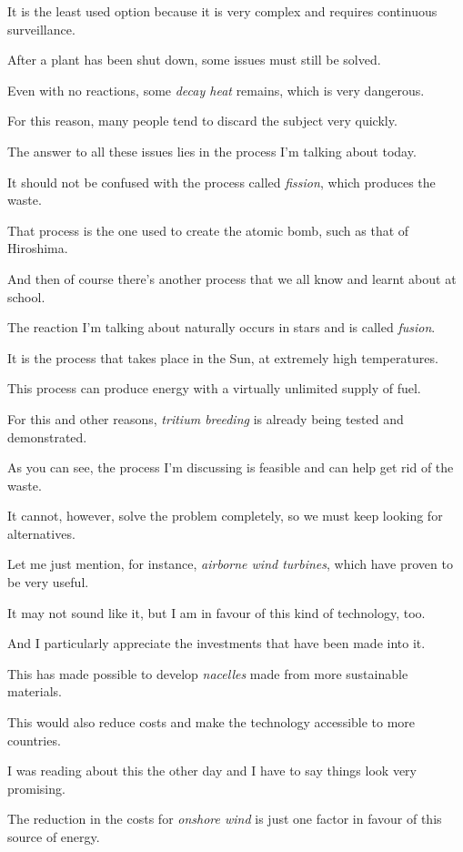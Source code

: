 It is the least used option because it is very complex and requires continuous surveillance.

\ex After a plant has been shut down, some issues must still be solved.

Even with no reactions, some \textit{decay heat} remains, which is very dangerous.

For this reason, many people tend to discard the subject very quickly.

\ex The answer to all these issues lies in the process I'm talking about today.

It should not be confused with the process called \textit{fission}, which produces the waste.

That process is the one used to create the atomic bomb, such as that of Hiroshima.

\ex And then of course there's another process that we all know and learnt about at school.

The reaction I'm talking about naturally occurs in stars and is called \textit{fusion}.

It is the process that takes place in the Sun, at extremely high temperatures.

\ex This process can produce energy with a virtually unlimited supply of fuel.

For this and other reasons, \textit{tritium breeding} is already being tested and demonstrated.

As you can see, the process I'm discussing is feasible and can help get rid of the waste.

\ex It cannot, however, solve the problem completely, so we must keep looking for alternatives.

Let me just mention, for instance, \textit{airborne wind turbines}, which have proven to be very useful.

It may not sound like it, but I am in favour of this kind of technology, too.

\ex And I particularly appreciate the investments that have been made into it.

This has made possible to develop \textit{nacelles} made from more sustainable materials.

This would also reduce costs and make the technology accessible to more countries.

\ex I was reading about this the other day and I have to say things look very promising.

The reduction in the costs for \textit{onshore wind} is just one factor in favour of this source of energy.

